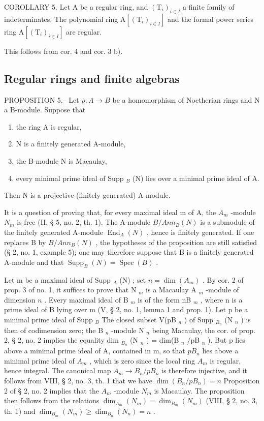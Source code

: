 COROLLARY 5. Let A be a regular ring, and \((\mathrm{T}_i)_{i\in I}\) a finite family of indeterminates. The polynomial ring \(\mathrm{A}[(\mathrm{T}_i)_{i\in I}]\) and the formal power series ring \(\mathrm{A}[(\mathrm{T}_i)_{i\in I}]\) are regular.

This follows from cor. 4 and cor. 3 b).

\subsection{Regular rings and finite algebras}

PROPOSITION 5.-- Let \(\rho: A \to B\) be a homomorphism of Noetherian rings and N a B-module. Suppose that

\begin{enumerate}
\def\labelenumi{\alph{enumi})}
\item
  the ring A is regular,
\item
  N is a finitely generated A-module,
\item
  the B-module N is Macaulay,
\item
  every minimal prime ideal of Supp \(_{B}\) (N) lies over a minimal prime ideal of A.
\end{enumerate}

Then N is a projective (finitely generated) A-module.

It is a question of proving that, for every maximal ideal m of A, the \(A_{m}\) -module \(N_{m}\) is free (II, § 5, no. 2, th. 1). The A-module \(B/Ann_{B}(N)\) is a submodule of the finitely generated A-module \(\operatorname{End}_{A}(N)\) , hence is finitely generated. If one replaces B by \(B/Ann_{B}(N)\) , the hypotheses of the proposition are still satisfied (§ 2, no. 1, example 5); one may therefore suppose that B is a finitely generated A-module and that \(\operatorname{Supp}_{B}(N) = \operatorname{Spec}(B)\) .

Let m be a maximal ideal of Supp \(_A\) (N) ; set \(n = \dim(A_m)\) . By cor. 2 of prop. 3 of no. 1, it suffices to prove that N \(_m\) is a Macaulay A \(_m\) -module of dimension \(n\) . Every maximal ideal of B \(_m\) is of the form nB \(_m\) , where n is a prime ideal of B lying over m (V, § 2, no. 1, lemma 1 and prop. 1). Let p be a minimal prime ideal of Supp \(_B\) The closed subset V(pB \(_n\) ) of Supp \(_{B_n}\) (N \(_n\) ) is then of codimension zero; the B \(_n\) -module N \(_n\) being Macaulay, the cor. of prop. 2, § 2, no. 2 implies the equality dim \(_{B_n}\) (N \(_n\) ) = dim(B \(_n\) /pB \(_n\) ). But p lies above a minimal prime ideal of A, contained in m, so that \(pB_{n}\) lies above a minimal prime ideal of \(A_{m}\) , which is zero since the local ring \(A_{m}\) is regular, hence integral. The canonical map \(A_{m} \to B_{n}/pB_{n}\) is therefore injective, and it follows from VIII, § 2, no. 3, th. 1 that we have \(\dim(B_{n}/pB_{n}) = n\) Proposition 2 of § 2, no. 2 implies that the \(A_{m}\) -module \(N_{m}\) is Macaulay. The proposition then follows from the relations \(\dim_{A_{m}}(N_{m}) = \dim_{B_{m}}(N_{m})\) (VIII, § 2, no. 3, th. 1) and \(\dim_{B_{m}}(N_{m}) \geqslant \dim_{B_{n}}(N_{n}) = n\) .

